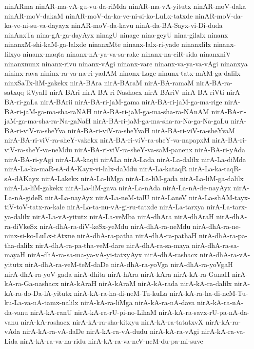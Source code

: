 {ninARma
ninAR-ma-vA-gu-vu-da-riMda
ninAR-ma-vA-yitutx
ninAR-moV-daka
ninAR-moV-dakaM
ninAR-moV-da-ka-ve-ni-si-ko-LuLx-tatxde
ninAR-moV-da-ka-ve-ni-su-va-dayayx
ninAR-moV-da-kavu
ninA-da-BA-Sayx-vi-Di-duda
ninAnxTa
nina-gA-ga-dayAyx
ninagU
ninage
nina-geyU
nina-gilalx
ninanx
ninanxM-shi-kaM-ga-lalxde
ninanxMte
ninanx-lalx-ri-yade
ninanxlilx
ninanx-lilxyo
ninanx-maqta
ninanx-nA-ya-va-sa-rake
ninanx-na-ciR-sida
ninanxniV
ninanxnunx
ninanx-rivu
ninanx-vAgi
ninanx-vare
ninanx-va-ya-va-vAgi
ninanxya
nininx-rava
nininx-ra-va-na-ri-yadAM
ninonx-Lage
ninunx-tatx-mAM-ga-dalilx
ninxSaTx-liM-gakekx
nirA-BAra
nirA-BAraM
nirA-BA-ramaM
nirA-BA-ra-satxqq-tiVyaH
nirA-BAri
nirA-BA-ri-Nashacx
nirA-BAriV
nirA-BA-riVti
nirA-BA-ri-gaLa
nirA-BArii
nirA-BA-ri-jaM-gama
nirA-BA-ri-jaM-ga-ma-rige
nirA-BA-ri-jaM-ga-ma-sha-raNAH
nirA-BA-ri-jaM-ga-ma-sha-ra-NAnAM
nirA-BA-ri-jaM-ga-ma-sha-ra-Na-gaNaH
nirA-BA-ri-jaM-ga-ma-sha-ra-Na-ga-Na-gaLu
nirA-BA-ri-viV-ra-sheYva
nirA-BA-ri-viV-ra-sheYvaH
nirA-BA-ri-viV-ra-sheYvaM
nirA-BA-ri-viV-ra-sheY-vakekx
nirA-BA-ri-viV-ra-sheY-va-napapxM
nirA-BA-ri-viV-ra-sheY-va-neMdu
nirA-BA-ri-viV-ra-sheY-va-saM-panenx
nirA-BA-ri-yAda
nirA-BA-ri-yAgi
nirA-LA-kaqti
nirALa
nirA-Lada
nirA-La-dalilx
nirA-La-diMda
nirA-La-ka-maR-sA-dA-Kayx-vi-lalx-daMdu
nirA-La-kataqR
nirA-La-ka-taqR-sA-dAKayx
nirA-Lakekx
nirA-La-liMga
nirA-La-liM-gada
nirA-La-liM-ga-dalilx
nirA-La-liM-gakekx
nirA-La-liM-gava
nirA-La-nAda
nirA-La-nA-de-nayAyx
nirA-La-nA-gideR
nirA-La-nayAyx
nirA-La-neM-talU
nirA-LaneV
nirA-La-shAM-tayx-tiV-toV-tatx-ra-kale
nirA-La-ta-nu-vA-gi-ru-tatxde
nirA-La-tarxya
nirA-La-tarx-ya-dalilx
nirA-La-vA-yitutx
nirA-La-veMba
nirA-dhAra
nirA-dhAraH
nirA-dhA-ra-diVkeSx
nirA-dhA-ra-diV-keSx-yeMdu
nirA-dhA-ra-neMdu
nirA-dhA-ra-ne-ninx-si-ko-LuLx-tAtxne
nirA-dhA-ra-patha
nirA-dhA-ra-pathaH
nirA-dhA-ra-pa-tha-dalilx
nirA-dhA-ra-pa-tha-veM-dare
nirA-dhA-ra-sa-maya
nirA-dhA-ra-sa-mayaH
nirA-dhA-ra-sa-ma-ya-vA-yi-tatxyAyx
nirA-dhA-rashacx
nirA-dhA-ra-vA-yitutx
nirA-dhA-ra-veM-teM-daDe
nirA-dhA-ra-yoVga
nirA-dhA-ra-yoVgaH
nirA-dhA-ra-yoV-gada
nirA-dhita
nirA-hAra
nirA-kAra
nirA-kA-ra-GanaH
nirA-kA-ra-Ga-nashacx
nirA-kAraH
nirA-kAraM
nirA-kA-rada
nirA-kA-ra-dalilx
nirA-kA-ra-do-Da-lA-yitutx
nirA-kA-ra-ha-di-neM-Tu-kuLa
nirA-kA-ra-ha-di-neM-Tu-ku-La-va-nA-tamx-nalilx
nirA-kA-ra-liMga
nirA-kA-ra-nA-dava
nirA-kA-ra-nA-da-vanu
nirA-kA-ranU
nirA-kA-ra-rU-pi-no-LihaM
nirA-kA-ra-savx-rU-pa-nA-da-vanu
nirA-kA-rashacx
nirA-kA-ra-sha-kitxyu
nirA-kA-ra-tatatxvX
nirA-kA-ra-vAda
nirA-kA-ra-vA-daDe
nirA-kA-ra-vA-dudu
nirA-kA-ra-vAgi
nirA-kA-ra-va-Lida
nirA-kA-ra-va-na-ridu
nirA-kA-ra-va-neV-neM-du-pa-mi-suve
}
